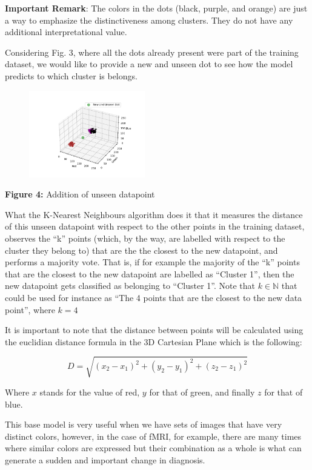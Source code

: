\documentclass[12pt]{article}
\begin{document}
\textbf{Important Remark}: The colors in the dots (black, purple, and orange) are just a way to emphasize the distinctiveness among clusters. They do not have any additional interpretational value.

Considering Fig. 3, where all the dots already present were part of the training dataset, we would like to provide a new and unseen dot to see how the model predicts to which cluster is belongs.

\begin{figure}[h]
    \centering
    \includegraphics[width=0.45\textwidth]{Figure_1.png}
  \end{figure}
  \begin{center}
    \textbf{Figure 4:} Addition of unseen datapoint
\end{center}

What the K-Nearest Neighbours algorithm does it that it measures the distance of this unseen datapoint with respect to the other points in the training dataset, observes the ``k'' points (which, by the way, are labelled with respect to the cluster they belong to) that are the the closest to the new datapoint,
and performs a majority vote. That is, if for example the majority of the ``k'' points that are the closest to the new datapoint are labelled as ``Cluster 1'', then the new datapoint gets classified as belonging to ``Cluster 1''. Note that $k \in \mathbb{N}$   that could be used for instance as ``The 4 points that are the closest to the new data point'', where $ k = 4$

It is important to note that the distance between points will be calculated using the euclidian distance formula in the 3D Cartesian Plane which is the following:

\begin{equation}
    D=\sqrt{ (x_2-x_1)^2+ (y_2 -y_1)^2+ (z_2-z_1)^2}
\end{equation}

Where $x$ stands for the value of red, $y$ for that of green, and finally $z$ for that of blue.

This base model is very useful when we have sets of images that have very distinct colors, however, in the case of fMRI, for example, there are many times where similar colors are expressed but their combination as a whole is
what can generate a sudden and important change in diagnosis.
\end{document}
